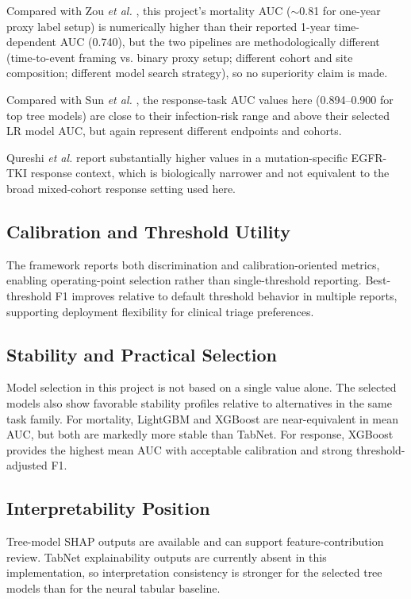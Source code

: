 \documentclass[journal]{IEEEtran}
\begin{document}
Compared with Zou \emph{et al.} \cite{zou2025}, this project's mortality AUC ($\sim$0.81 for one-year proxy label setup) is numerically higher than their reported 1-year time-dependent AUC (0.740), but the two pipelines are methodologically different (time-to-event framing vs. binary proxy setup; different cohort and site composition; different model search strategy), so no superiority claim is made.

Compared with Sun \emph{et al.} \cite{sun2024}, the response-task AUC values here (0.894--0.900 for top tree models) are close to their infection-risk range and above their selected LR model AUC, but again represent different endpoints and cohorts.

Qureshi \emph{et al.} \cite{qureshi2022} report substantially higher values in a mutation-specific EGFR-TKI response context, which is biologically narrower and not equivalent to the broad mixed-cohort response setting used here.

\subsection{Calibration and Threshold Utility}
The framework reports both discrimination and calibration-oriented metrics, enabling operating-point selection rather than single-threshold reporting. Best-threshold F1 improves relative to default threshold behavior in multiple reports, supporting deployment flexibility for clinical triage preferences.

\subsection{Stability and Practical Selection}
Model selection in this project is not based on a single value alone. The selected models also show favorable stability profiles relative to alternatives in the same task family. For mortality, LightGBM and XGBoost are near-equivalent in mean AUC, but both are markedly more stable than TabNet. For response, XGBoost provides the highest mean AUC with acceptable calibration and strong threshold-adjusted F1.

\subsection{Interpretability Position}
Tree-model SHAP outputs are available and can support feature-contribution review. TabNet explainability outputs are currently absent in this implementation, so interpretation consistency is stronger for the selected tree models than for the neural tabular baseline.
\end{document}
